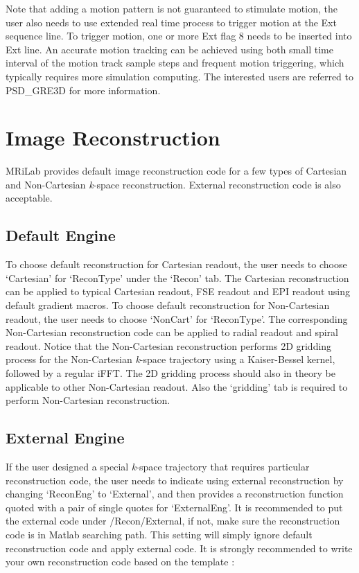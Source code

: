 \documentclass{book}%
\begin{document}
Note that adding a motion pattern is not guaranteed to stimulate motion, the user also needs to use extended real time process to trigger motion at the Ext sequence line. To trigger motion, one or more Ext flag 8 needs to be inserted into Ext line. An accurate motion tracking can be achieved using both small time interval of the motion track sample steps and frequent motion triggering, which typically requires more simulation computing. The interested users are referred to PSD\_GRE3D for more information.

\section{Image Reconstruction}

MRiLab provides default image reconstruction code for a few types of Cartesian and Non-Cartesian \textit{k}-space reconstruction. External reconstruction code is also acceptable.

\subsection{Default Engine}

To choose default reconstruction for Cartesian readout, the user needs to choose `Cartesian' for `ReconType' under the `Recon' tab. The Cartesian reconstruction can be applied to typical Cartesian readout, FSE readout and EPI readout using default gradient macros. To choose default reconstruction for Non-Cartesian readout, the user needs to choose `NonCart' for `ReconType'. The corresponding Non-Cartesian reconstruction code can be applied to radial readout and spiral readout. Notice that the Non-Cartesian reconstruction performs 2D gridding process for the Non-Cartesian \textit{k}-space trajectory using a Kaiser-Bessel kernel, followed by a regular iFFT. The 2D gridding process should also in theory be applicable to other Non-Cartesian readout. Also the `gridding' tab is required to perform Non-Cartesian reconstruction.


\subsection{External Engine}

If the user designed a special \textit{k}-space trajectory that requires particular reconstruction code, the user needs to indicate using external reconstruction by changing `ReconEng' to `External', and then provides a reconstruction function quoted with a pair of single quotes for `ExternalEng'. It is recommended to put the external code under /Recon/External, if not, make sure the reconstruction code is in Matlab searching path. This setting will simply ignore default reconstruction code and apply external code. It is strongly recommended to write your own reconstruction code based on the template :
\end{document}
